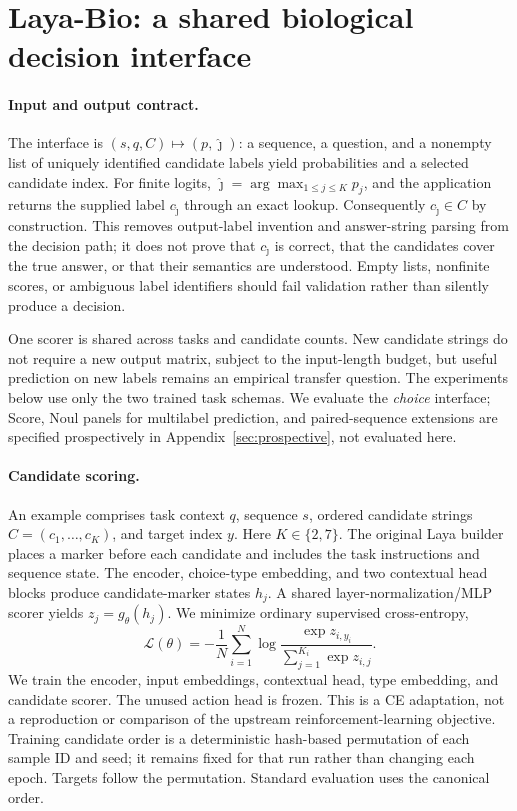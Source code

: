 \section{Laya-Bio: a shared biological decision interface}
\paragraph{Input and output contract.}
The interface is $(s,q,C)\mapsto(p,\hat\jmath)$: a sequence, a question, and a nonempty list of uniquely identified candidate labels yield probabilities and a selected candidate index. For finite logits, $\hat\jmath=\arg\max_{1\leq j\leq K}p_j$, and the application returns the supplied label $c_{\hat\jmath}$ through an exact lookup. Consequently $c_{\hat\jmath}\in C$ by construction. This removes output-label invention and answer-string parsing from the decision path; it does not prove that $c_{\hat\jmath}$ is correct, that the candidates cover the true answer, or that their semantics are understood. Empty lists, nonfinite scores, or ambiguous label identifiers should fail validation rather than silently produce a decision.

One scorer is shared across tasks and candidate counts. New candidate strings do not require a new output matrix, subject to the input-length budget, but useful prediction on new labels remains an empirical transfer question. The experiments below use only the two trained task schemas. We evaluate the \emph{choice} interface; Score, Noul panels for multilabel prediction, and paired-sequence extensions are specified prospectively in Appendix~\ref{sec:prospective}, not evaluated here.

\paragraph{Candidate scoring.}
An example comprises task context $q$, sequence $s$, ordered candidate strings $C=(c_1,\ldots,c_K)$, and target index $y$. Here $K\in\{2,7\}$. The original Laya builder places a marker before each candidate and includes the task instructions and sequence state. The encoder, choice-type embedding, and two contextual head blocks produce candidate-marker states $h_j$. A shared layer-normalization/MLP scorer yields $z_j=g_\theta(h_j)$. We minimize ordinary supervised cross-entropy,
\begin{equation}
\mathcal L(\theta)=-\frac1N\sum_{i=1}^{N}\log
\frac{\exp z_{i,y_i}}{\sum_{j=1}^{K_i}\exp z_{i,j}}.
\end{equation}
We train the encoder, input embeddings, contextual head, type embedding, and candidate scorer. The unused action head is frozen. This is a CE adaptation, not a reproduction or comparison of the upstream reinforcement-learning objective. Training candidate order is a deterministic hash-based permutation of each sample ID and seed; it remains fixed for that run rather than changing each epoch. Targets follow the permutation. Standard evaluation uses the canonical order.

